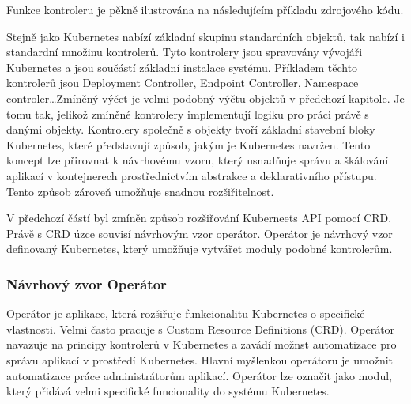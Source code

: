 Funkce kontroleru je pěkně ilustrována na následujícím příkladu zdrojového kódu.\cite{nguyen_2017_a}


Stejně jako Kubernetes nabízí základní skupinu standardních objektů, tak nabízí i standardní množinu kontrolerů. Tyto kontrolery jsou spravovány vývojáři Kubernetes a jsou součástí základní instalace systému. Příkladem těchto kontrolerů jsou Deployment Controller, Endpoint Controller, Namespace controler\ldots Zmíněný výčet je velmi podobný výčtu objektů v předchozí kapitole. Je tomu tak, jelikož zmíněné kontrolery implementují logiku pro práci právě s danými objekty. Kontrolery společně s objekty tvoří základní stavební bloky Kubernetes, které představují způsob, jakým je Kubernetes navržen. Tento koncept lze přirovnat k návrhovému vzoru, který usnadňuje správu a škálování aplikací v kontejnerech prostřednictvím abstrakce a deklarativního přístupu. Tento způsob zároveň umožňuje snadnou rozšiřitelnost.

V předchozí částí byl zmíněn způsob rozšiřování Kuberneets API pomocí CRD. Právě s CRD úzce souvisí návrhovým vzor operátor. Operátor je návrhový vzor definovaný Kubernetes, který umožňuje vytvářet moduly podobné kontrolerům. 
\subsubsection{Návrhový zvor Operátor}
Operátor je aplikace, která rozšiřuje funkcionalitu Kubernetes o specifické vlastnosti. Velmi často pracuje s Custom Resource Definitions (CRD). Operátor navazuje na principy kontrolerů v Kubernetes a zavádí možnst automatizace pro správu aplikací v prostředí Kubernetes. Hlavní myšlenkou operátoru je umožnit automatizace práce administrátorům aplikací. Operátor lze označit jako modul, který přidává velmi specifické funcionality do systému Kubernetes. 

